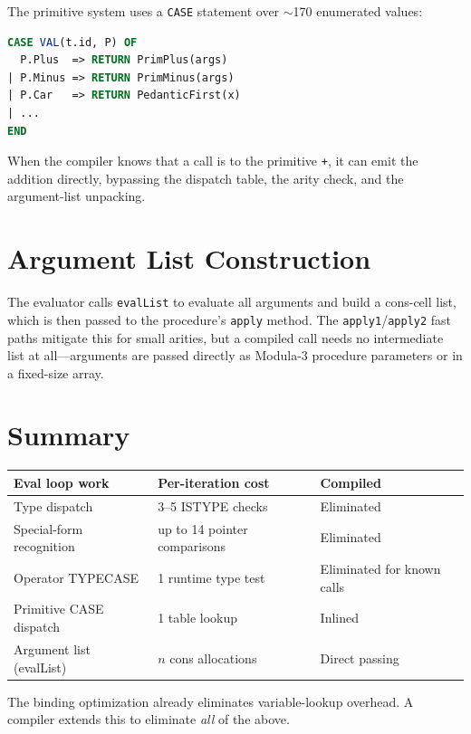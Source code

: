 \documentclass[12pt]{report}
\begin{document}
The primitive system uses a \texttt{CASE} statement over
$\sim$170 enumerated values:

\begin{lstlisting}[language=Modula3]
CASE VAL(t.id, P) OF
  P.Plus  => RETURN PrimPlus(args)
| P.Minus => RETURN PrimMinus(args)
| P.Car   => RETURN PedanticFirst(x)
| ...
END
\end{lstlisting}

When the compiler knows that a call is to the primitive \texttt{+},
it can emit the addition directly, bypassing the dispatch table,
the arity check, and the argument-list unpacking.

\section{Argument List Construction}
\label{sec:arglist}

The evaluator calls \texttt{evalList} to evaluate all arguments and
build a cons-cell list, which is then passed to the procedure's
\texttt{apply} method.  The \texttt{apply1}/\texttt{apply2}
fast paths mitigate this for small arities, but a compiled call
needs no intermediate list at all---arguments are passed directly
as Modula-3 procedure parameters or in a fixed-size array.

\section{Summary}

\begin{center}
\begin{tabular}{lll}
\toprule
\textbf{Eval loop work} & \textbf{Per-iteration cost} & \textbf{Compiled} \\
\midrule
Type dispatch & 3--5 ISTYPE checks & Eliminated \\
Special-form recognition & up to 14 pointer comparisons & Eliminated \\
Operator TYPECASE & 1 runtime type test & Eliminated for known calls \\
Primitive CASE dispatch & 1 table lookup & Inlined \\
Argument list (evalList) & $n$ cons allocations & Direct passing \\
\bottomrule
\end{tabular}
\end{center}

The binding optimization already eliminates variable-lookup overhead.
A compiler extends this to eliminate \emph{all} of the above.
\end{document}
